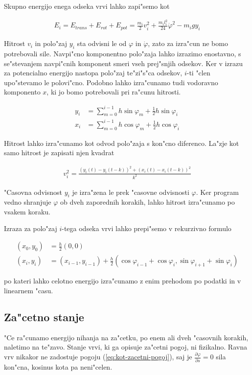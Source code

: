 \documentclass[a4paper,10pt]{article}
\renewcommand{\phi}{\varphi}
\newcommand{\parcialno}[2]{
  \frac{\partial #1}{\partial #2}
}
\begin{document}
Skupno energijo enega odseka vrvi lahko zapi"semo kot

\begin{align}
 E_i = E_{trans} + E_{rot} + E_{pot} = \frac{m_i}{2} v_i^2 + \frac{m_i l_i^2}{24} \dot{\phi}^2- m_i g y_i
\end{align}

Hitrost $v_i$ in polo"zaj $y_i$ sta odvisni le od $\phi$ in $\dot\phi$, zato za izra"cun ne bomo potrebovali sile. Navpi"cno komponentno polo"zaja lahko izrazimo enostavno, s se"stevanjem navpi"cnih komponent smeri vseh prej"snjih odsekov. Ker v izrazu za potencialno energijo nastopa polo"zaj te"zi"s"ca odsekov, $i$-ti "clen upo"stevamo le polovi"cno. Podobno lahko izra"cunamo tudi vodoravno komponento $x$, ki jo bomo potrebovali pri ra"cunu hitrosti. 

\begin{align}
 y_i &= \sum_{m=0}^{i-1} h \sin \phi_m + \frac{1}{2}h\sin\phi_i \\
 x_i &= \sum_{m=0}^{i-1} h \cos \phi_m + \frac{1}{2}h\cos\phi_i
\end{align}

Hitrost lahko izra"cunamo kot odvod polo"zaja s kon"cno diferenco. La"zje kot samo hitrost je zapisati njen kvadrat

\begin{align}
 v_i^2 = \frac{\left(y_i(t) - y_i(t-k)\right)^2 + \left(x_i(t) - x_i(t-k)\right)^2}{k^2}
\end{align}

"Casovna odvisnost $y_i$ je izra"zena le prek "casovne odvisnosti $\phi$. Ker program vedno shranjuje $\phi$ ob dveh zaporednih korakih, lahko hitrost izra"cunamo po vsakem koraku. 

Izraza za polo"zaj $i$-tega odseka vrvi lahko prepi"semo v rekurzivno formulo

\begin{align}
 (x_0, y_0) &= \frac{h}{2}(0, 0) \\
 (x_i, y_i) &= (x_{i-1}, y_{i-1}) + \frac{h}{2} (\cos\phi_{i-1} + \cos\phi_i, \sin\phi_{i+1} + \sin\phi_i)
\end{align}

po kateri lahko celotno energijo izra"cunamo z enim prehodom po podatki in v linearnem "casu. 

\subsection{Za"cetno stanje}

"Ce ra"cunamo energijo nihanja na za"cetku, po enem ali dveh "casovnih korakih, naletimo na te"zavo. Stanje vrvi, ki ga opisuje za"cetni pogoj, ni fizikalno. Ravna vrv nikakor ne zadostuje pogoju (\ref{eq:kot-zacetni-pogoj}), saj je $\parcialno{\phi}{s}=0$ sila kon"cna, kosinus kota pa neni"celen. 
\end{document}

